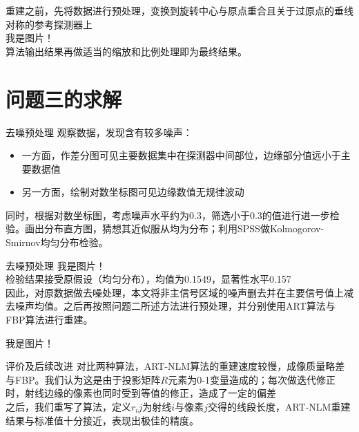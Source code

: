 \documentclass{beamer}
\begin{document}
\begin{frame}
  重建之前，先将数据进行预处理，变换到旋转中心与原点重合且关于过原点的垂线对称的参考探测器上\\
  我是图片！\\
  算法输出结果再做适当的缩放和比例处理即为最终结果。
\end{frame}

\section{问题三的求解}

\begin{frame}{去噪预处理}
  观察数据，发现含有较多噪声：
  \begin{itemize}
    \item 一方面，作差分图可见主要数据集中在探测器中间部位，边缘部分值远小于主要数据值
    \item 另一方面，绘制对数坐标图可见边缘数值无规律波动
  \end{itemize}
  同时，根据对数坐标图，考虑噪声水平约为0.3，筛选小于0.3的值进行进一步检验。画出分布直方图，猜想其近似服从均为分布；利用SPSS做Kolmogorov-Smirnov均匀分布检验。
\end{frame}

\begin{frame}{去噪预处理}
  我是图片！\\
  检验结果接受原假设（均匀分布），均值为0.1549，显著性水平0.157\\
  因此，对原数据做去噪处理，本文将非主信号区域的噪声删去并在主要信号值上减去噪声均值。之后再按照问题二所述方法进行预处理，并分别使用ART算法与FBP算法进行重建。
\end{frame}

\begin{frame}
  我是图片！
\end{frame}

\begin{frame}{评价及后续改进}
  对比两种算法，ART-NLM算法的重建速度较慢，成像质量略差与FBP。我们认为这是由于投影矩阵$R$元素为0-1变量造成的；每次做迭代修正时，射线边缘的像素也同时受到等值的修正，造成了一定的偏差\\
  之后，我们重写了算法，定义\(r_ij\)为射线$i$与像素$j$交得的线段长度，ART-NLM重建结果与标准值十分接近，表现出极佳的精度。
\end{frame}
\end{document}
